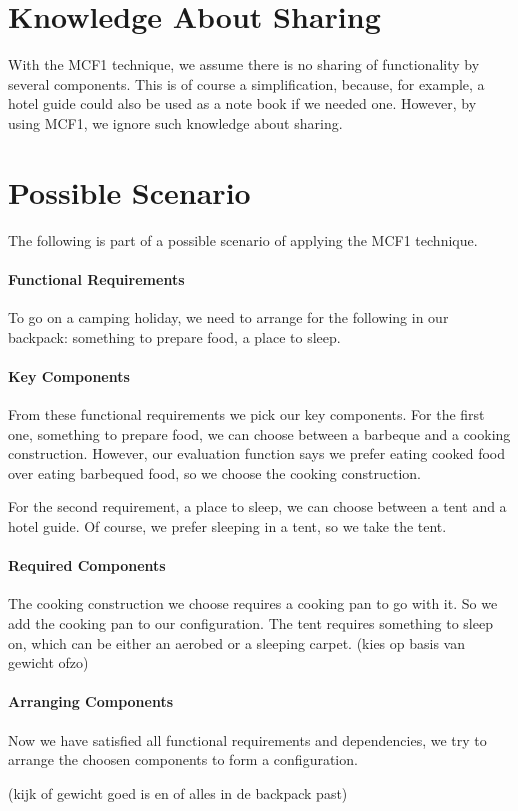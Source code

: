 \documentclass[a4paper,11pt]{article}
\begin{document}
\section{Knowledge About Sharing}

With the MCF1 technique, we assume there is no sharing of functionality by
several components. This is of course a simplification, because, for example, a
hotel guide could also be used as a note book if we needed one. However, by
using MCF1, we ignore such knowledge about sharing.


\section{Possible Scenario}

The following is part of a possible scenario of applying the
MCF1 technique.

\paragraph{Functional Requirements}

To go on a camping holiday, we need to arrange for the following
in our backpack: something to prepare food, a place to sleep.

\paragraph{Key Components}

From these functional requirements we pick our key components. For
the first one, something to prepare food, we can choose between a
barbeque and a cooking construction. However, our evaluation
function says we prefer eating cooked food over eating barbequed
food, so we choose the cooking construction.

For the second requirement, a place to sleep, we can choose between
a tent and a hotel guide. Of course, we prefer sleeping in a tent,
so we take the tent.

\paragraph{Required Components}

The cooking construction we choose requires a cooking pan to go
with it. So we add the cooking pan to our configuration. The tent
requires something to sleep on, which can be either an aerobed or
a sleeping carpet. (kies op basis van gewicht ofzo)

\paragraph{Arranging Components}

Now we have satisfied all functional requirements and dependencies,
we try to arrange the choosen components to form a configuration.

(kijk of gewicht goed is en of alles in de backpack past)
\end{document}
